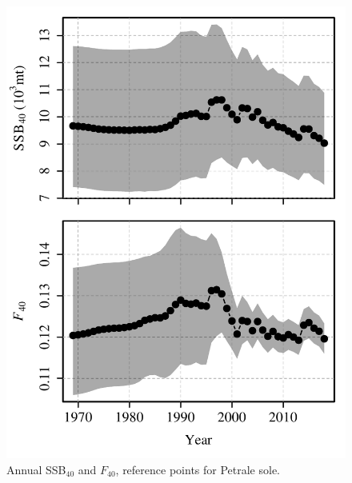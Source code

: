 \documentclass[]{article}
\begin{document}
\begin{figure}
\caption{Annual SSB$_{40}$ and $F_{40}$, reference points for Petrale sole.}\label{BRPs}
\begin{center}
\includegraphics[height = 0.8\textheight]{../results/ssm_temp/petrale_BRPs.pdf}
\end{center}
\end{figure}


\end{document}
